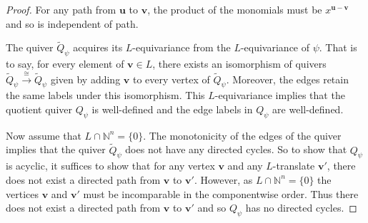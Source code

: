 \documentclass{amsart}
\newcommand{\NN}{\mathbb{N}}
\theoremstyle{remark}
\begin{document}
\begin{proof}
  For any path from $\bm{u}$ to $\bm{v}$, the product of the monomials must be $x^{\bm{u}-\bm{v}}$ and so is independent of path.
  
  The quiver $\widetilde{Q}_\psi$ acquires its $L$-equivariance from the $L$-equivariance of $\psi$. That is to say, for every element of $\bm{v}\in L$, there exists an isomorphism of quivers $\widetilde{Q}_\psi \xrightarrow{\cong} \widetilde{Q}_\psi$ given by adding $\bm{v}$ to every vertex of $\widetilde{Q}_\psi$. Moreover, the edges retain the same labels under this isomorphism. This $L$-equivariance implies that the quotient quiver $Q_\psi$ is well-defined and the edge labels in $Q_\psi$ are well-defined.

  Now assume that $L\cap \NN^n=\{0\}$. The monotonicity of the edges of the quiver implies that the quiver $\widetilde{Q}_\psi$ does not have any directed cycles.
  So to show that $Q_\psi$ is acyclic, it suffices to show that for any vertex $\bm{v}$ and any $L$-translate $\bm{v}'$, there does not exist a directed path from $\bm{v}$ to $\bm{v}'$.
  However, as $L\cap \NN^n=\{0\}$ the vertices $\bm{v}$ and $\bm{v}'$ must be incomparable in the componentwise order.
  Thus there does not exist a directed path from $\bm{v}$ to $\bm{v}'$ and so $Q_\psi$ has no directed cycles.
\end{proof}
\end{document}
